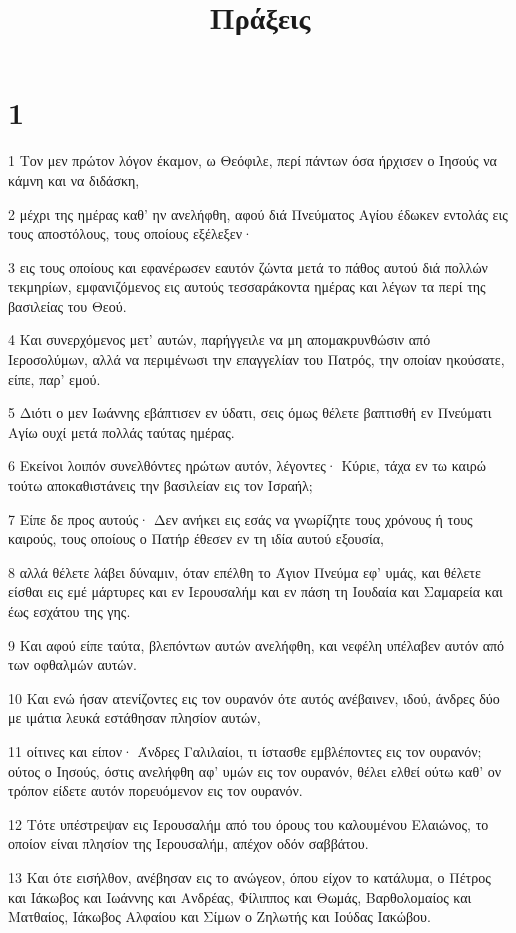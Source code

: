 

\title{Πράξεις}


\chapter{1}

\par 1 Τον μεν πρώτον λόγον έκαμον, ω Θεόφιλε, περί πάντων όσα ήρχισεν ο Ιησούς να κάμνη και να διδάσκη,
\par 2 μέχρι της ημέρας καθ' ην ανελήφθη, αφού διά Πνεύματος Αγίου έδωκεν εντολάς εις τους αποστόλους, τους οποίους εξέλεξεν·
\par 3 εις τους οποίους και εφανέρωσεν εαυτόν ζώντα μετά το πάθος αυτού διά πολλών τεκμηρίων, εμφανιζόμενος εις αυτούς τεσσαράκοντα ημέρας και λέγων τα περί της βασιλείας του Θεού.
\par 4 Και συνερχόμενος μετ' αυτών, παρήγγειλε να μη απομακρυνθώσιν από Ιεροσολύμων, αλλά να περιμένωσι την επαγγελίαν του Πατρός, την οποίαν ηκούσατε, είπε, παρ' εμού.
\par 5 Διότι ο μεν Ιωάννης εβάπτισεν εν ύδατι, σεις όμως θέλετε βαπτισθή εν Πνεύματι Αγίω ουχί μετά πολλάς ταύτας ημέρας.
\par 6 Εκείνοι λοιπόν συνελθόντες ηρώτων αυτόν, λέγοντες· Κύριε, τάχα εν τω καιρώ τούτω αποκαθιστάνεις την βασιλείαν εις τον Ισραήλ;
\par 7 Είπε δε προς αυτούς· Δεν ανήκει εις εσάς να γνωρίζητε τους χρόνους ή τους καιρούς, τους οποίους ο Πατήρ έθεσεν εν τη ιδία αυτού εξουσία,
\par 8 αλλά θέλετε λάβει δύναμιν, όταν επέλθη το Άγιον Πνεύμα εφ' υμάς, και θέλετε είσθαι εις εμέ μάρτυρες και εν Ιερουσαλήμ και εν πάση τη Ιουδαία και Σαμαρεία και έως εσχάτου της γης.
\par 9 Και αφού είπε ταύτα, βλεπόντων αυτών ανελήφθη, και νεφέλη υπέλαβεν αυτόν από των οφθαλμών αυτών.
\par 10 Και ενώ ήσαν ατενίζοντες εις τον ουρανόν ότε αυτός ανέβαινεν, ιδού, άνδρες δύο με ιμάτια λευκά εστάθησαν πλησίον αυτών,
\par 11 οίτινες και είπον· Άνδρες Γαλιλαίοι, τι ίστασθε εμβλέποντες εις τον ουρανόν; ούτος ο Ιησούς, όστις ανελήφθη αφ' υμών εις τον ουρανόν, θέλει ελθεί ούτω καθ' ον τρόπον είδετε αυτόν πορευόμενον εις τον ουρανόν.
\par 12 Τότε υπέστρεψαν εις Ιερουσαλήμ από του όρους του καλουμένου Ελαιώνος, το οποίον είναι πλησίον της Ιερουσαλήμ, απέχον οδόν σαββάτου.
\par 13 Και ότε εισήλθον, ανέβησαν εις το ανώγεον, όπου είχον το κατάλυμα, ο Πέτρος και Ιάκωβος και Ιωάννης και Ανδρέας, Φίλιππος και Θωμάς, Βαρθολομαίος και Ματθαίος, Ιάκωβος Αλφαίου και Σίμων ο Ζηλωτής και Ιούδας Ιακώβου.
